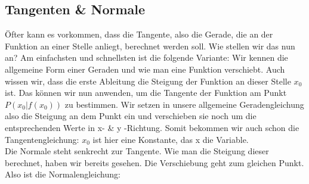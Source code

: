 \subsection{Tangenten \& Normale}
	Öfter kann es vorkommen, dass die Tangente, also die Gerade, die an der
	Funktion an einer Stelle anliegt, berechnet werden soll. Wie stellen wir das
	nun an? Am einfachsten und schnellsten ist die folgende Variante: Wir kennen
	die allgemeine Form einer Geraden und wie man eine Funktion verschiebt. Auch
	wissen wir, dass die erste Ableitung die Steigung der Funktion an dieser Stelle
	\(x_0\) ist. Das können wir nun anwenden, um die Tangente der Funktion am Punkt
	\(P(x_0|f(x_0))\) zu bestimmen. Wir setzen in unsere allgemeine
	Geradengleichung also die Steigung an dem Punkt ein und verschieben sie noch um
	die entsprechenden Werte in x- \& y -Richtung. Somit bekommen wir auch schon
	die Tangentengleichung:
	\formel{\[t(x)=f'(x_0)\cdot (x-x_0)+f(x_0)\]}
	\(x_0\) ist hier eine Konstante, das x die Variable.\\
	Die Normale steht senkrecht zur Tangente. Wie man die Steigung dieser
	berechnet, haben wir bereits gesehen. Die Verschiebung geht zum gleichen Punkt.
	Also ist die Normalengleichung:
	\formel{\[n(x)=-\frac{1}{f'(x_0)}\cdot (x-x_0)+f(x_0)\]}
	
	
